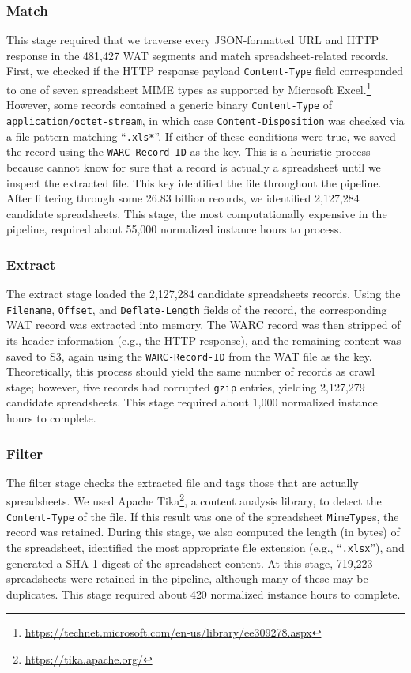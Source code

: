 \documentclass[conference]{IEEEtran}
\begin{document}
\subsubsection{Match} 

This stage required that we traverse every JSON-formatted URL and HTTP response in the 481,427 WAT segments and match spreadsheet-related records. First, we checked if the HTTP response payload \texttt{Content-Type} field corresponded to one of seven spreadsheet MIME types as supported by Microsoft Excel.\footnote{\url{https://technet.microsoft.com/en-us/library/ee309278.aspx}} However, some records contained a generic binary \texttt{Content-Type} of \texttt{application/octet-stream}, in which case \texttt{Content-Disposition} was checked via a file pattern matching ``\texttt{.xls*}''. If either of these conditions were true, we saved the record using the \texttt{WARC-Record-ID} as the key. This is a heuristic process because cannot know for sure that a record is actually a spreadsheet until we inspect the extracted file. This key identified the file throughout the pipeline. After filtering through some 26.83 billion records, we identified 2,127,284 candidate spreadsheets. This stage, the most computationally expensive in the pipeline, required about 55,000 normalized instance hours to process.

\subsubsection{Extract} 

The extract stage loaded the 2,127,284 candidate spreadsheets records. Using the \texttt{Filename}, \texttt{Offset}, and \texttt{Deflate-Length} fields of the record, the corresponding WAT record was extracted into memory. The WARC record was then stripped of its header information (e.g., the HTTP response), and the remaining content was saved to S3, again using the \texttt{WARC-Record-ID} from the WAT file as the key. Theoretically, this process should yield the same number of records as crawl stage; however, five records had corrupted \texttt{gzip} entries, yielding 2,127,279 candidate spreadsheets. This stage required about 1,000 normalized instance hours to complete.

\subsubsection{Filter}

The filter stage checks the extracted file and tags those that are actually spreadsheets. We used Apache Tika\footnote{\url{https://tika.apache.org/}}, a content analysis library, to detect the \texttt{Content-Type} of the file. If this result was one of the spreadsheet \texttt{MimeType}s, the record was retained. During this stage, we also computed the length (in bytes) of the spreadsheet, identified the most appropriate file extension (e.g., ``\texttt{.xlsx}''), and generated a SHA-1 digest of the spreadsheet content.  At this stage, 719,223 spreadsheets were retained in the pipeline, although many of these may be duplicates. This stage required about 420 normalized instance hours to complete.
\end{document}
